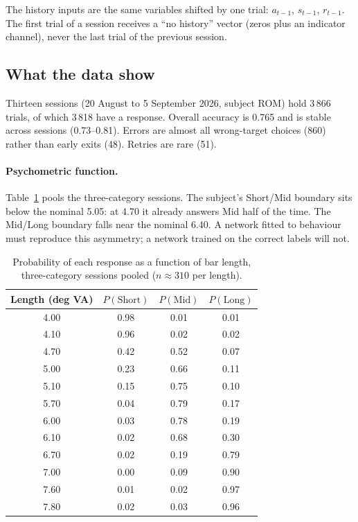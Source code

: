 \documentclass[11pt,a4paper]{article}
\newcommand{\Short}{\mathrm{Short}}
\newcommand{\Mid}{\mathrm{Mid}}
\newcommand{\Long}{\mathrm{Long}}
\begin{document}
The history inputs are the same variables shifted by one trial: $a_{t-1}$, $s_{t-1}$,
$r_{t-1}$. The first trial of a session receives a ``no history'' vector (zeros plus an
indicator channel), never the last trial of the previous session.

\subsection{What the data show}

Thirteen sessions (20 August to 5 September 2026, subject ROM) hold 3\,866 trials, of
which 3\,818 have a response. Overall accuracy is 0.765 and is stable across sessions
(0.73--0.81). Errors are almost all wrong-target choices (860) rather than early exits
(48). Retries are rare (51).

\paragraph{Psychometric function.} Table~\ref{tab:psycho} pools the three-category
sessions. The subject's Short/Mid boundary sits below the nominal 5.05: at 4.70 it
already answers Mid half of the time. The Mid/Long boundary falls near the nominal 6.40.
A network fitted to behaviour must reproduce this asymmetry; a network trained on the
correct labels will not.

\begin{table}[H]
  \centering\small
  \caption{Probability of each response as a function of bar length, three-category
  sessions pooled ($n \approx 310$ per length).}
  \label{tab:psycho}
  \begin{tabular}{cccc}
    \toprule
    Length (deg VA) & $P(\Short)$ & $P(\Mid)$ & $P(\Long)$ \\
    \midrule
    4.00 & 0.98 & 0.01 & 0.01 \\
    4.10 & 0.96 & 0.02 & 0.02 \\
    4.70 & 0.42 & 0.52 & 0.07 \\
    5.00 & 0.23 & 0.66 & 0.11 \\
    5.10 & 0.15 & 0.75 & 0.10 \\
    5.70 & 0.04 & 0.79 & 0.17 \\
    6.00 & 0.03 & 0.78 & 0.19 \\
    6.10 & 0.02 & 0.68 & 0.30 \\
    6.70 & 0.02 & 0.19 & 0.79 \\
    7.00 & 0.00 & 0.09 & 0.90 \\
    7.60 & 0.01 & 0.02 & 0.97 \\
    7.80 & 0.02 & 0.03 & 0.96 \\
    \bottomrule
  \end{tabular}
\end{table}
\end{document}

